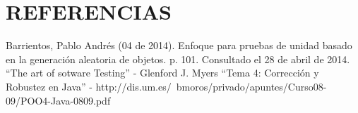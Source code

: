 \section{REFERENCIAS} 
Barrientos, Pablo Andrés (04 de 2014). Enfoque para pruebas de unidad basado en la generación aleatoria de objetos. p. 101. Consultado el 28 de abril de 2014.
“The art of sotware Testing” - Glenford J. Myers
“Tema 4: Corrección y Robustez en Java” - http://dis.um.es/~bmoros/privado/apuntes/Curso08-09/POO4-Java-0809.pdf
